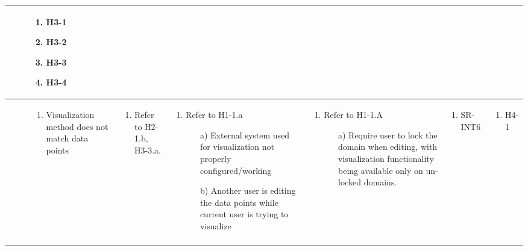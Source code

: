 \documentclass{article}
\begin{document}
\begin{landscape}
\begin{longtable}{|p{2cm}|p{4cm}|p{4cm}|p{4cm}|p{4cm}|p{2cm}|p{2cm}|}
\begin{enumerate}[leftmargin=*]
  \end{enumerate} &
  \begin{enumerate}[leftmargin=*]
    \item H3-1
    \item H3-2
    \item H3-3
    \item H3-4
  \end{enumerate} \\
  \hline
   & 
  \begin{enumerate}[leftmargin=*]
      \item Visualization method does not match data points
  \end{enumerate} & 
  \begin{enumerate}[leftmargin=*]
      \item Refer to H2-1.b, H3-3.a.
  \end{enumerate} &
  \begin{enumerate}[leftmargin=*]
    \item Refer to H1-1.a
    \begin{enumerate}
        \item[a)] External system used for visualization not properly configured/working
        \item[b)] Another user is editing the data points while current user is trying to visualize
    \end{enumerate}
  \end{enumerate} &
  \begin{enumerate}[leftmargin=*]
    \item Refer to H1-1.A
    \begin{enumerate}
        \item[a)] Require user to lock the domain when editing, with visualization functionality being available only on un-locked domains.
    \end{enumerate}
  \end{enumerate} &
  \begin{enumerate}[leftmargin=*]
       \item SR-INT6
  \end{enumerate} &
  \begin{enumerate}[leftmargin=*]
       \item H4-1
  \end{enumerate} \\
  \hline
   & 

\end{longtable}
\end{landscape}
\end{document}

